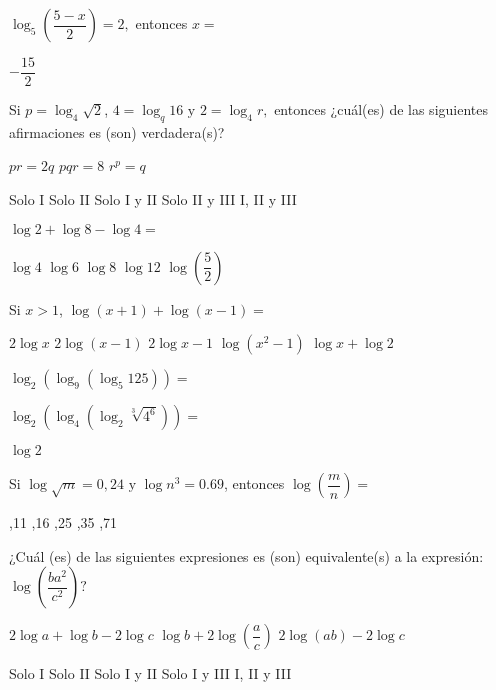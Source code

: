 \documentclass[pagina vacia]{srs}
\begin{document}
\begin{preguntas}
\pregunta $\log_{5}\left(\dfrac{5-x}{2}\right)=2,$ entonces $x=$
\begin{vertical}
\alternativa $-\dfrac{15}{2}$
\end{vertical}

\pregunta Si $p=\log_{4}\sqrt{2}$, $4=\log_{q}16 \text{ y } 2=\log_{4}r,$ entonces ¿cuál(es) de las siguientes afirmaciones es (son) verdadera(s)?
\begin{verticali}
\alternativa $pr=2q$
\alternativa $pqr=8$
\alternativa $r^{p}=q$
\end{verticali}
\begin{vertical}
\alternativa Solo I
\alternativa Solo II
\alternativa Solo I y II
\alternativa Solo II y III
\alternativa I, II y III
\end{vertical}

\pregunta $\log 2+\log 8-\log 4=$
\begin{vertical}
\alternativa $\log 4$
\alternativa $\log 6$
\alternativa $\log 8$
\alternativa $\log 12$
\alternativa $\log\left(\dfrac{5}{2}\right)$
\end{vertical}

\pregunta Si $x>1$, $\log\left(x+1\right)+\log\left(x-1\right)=$
\begin{vertical}
\alternativa $2 \log x$
\alternativa $2 \log\left(x-1\right)$
\alternativa $2 \log x-1$
\alternativa $\log\left(x^{2}-1\right)$
\alternativa $\log x+\log 2$
\end{vertical}

\pregunta $\log_{2}\left(\log_{9}\left(\log_{5}125\right)\right)=$
\begin{vertical}
\end{vertical}

\pregunta $\log_{2}\left(\log_{4}\left(\log_{2}\sqrt[3]{4^{6}}\right)\right)=$
\begin{vertical}
\alternativa $\log 2$
\end{vertical}

\pregunta Si $\log\sqrt{m}=0,24 \text{ y } \log n^{3}=0.69$, entonces $\log\left(\dfrac{m}{n}\right)=$
\begin{vertical}
,11
,16
,25
,35
,71
\end{vertical}

\pregunta ¿Cuál (es) de las siguientes expresiones es (son) equivalente(s) a la expresión: $\log\left(\dfrac{ba^{2}}{c^{2}}\right)?$
\begin{verticali}
\alternativa $2 \log a+\log b-2 \log c$
\alternativa $\log b+2 \log\left(\dfrac{a}{c}\right)$
\alternativa $2 \log\left(ab\right)-2 \log c$
\end{verticali}
\begin{vertical}
\alternativa Solo I
\alternativa Solo II
\alternativa Solo I y II
\alternativa Solo I y III
\alternativa I, II y III
\end{vertical}


\end{preguntas}
\end{document}
